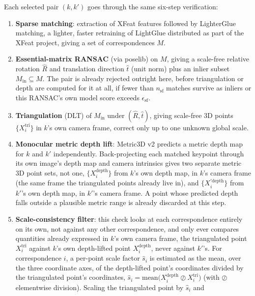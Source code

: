 Each selected pair $(k, k')$ goes through the same six-step verification:
\begin{enumerate}
  \item \textbf{Sparse matching}: extraction of XFeat features \cite{potje2024xfeat} followed by
    LighterGlue matching, a lighter, faster retraining of LightGlue
    \cite{lindenberger2023lightglue} distributed as part of the XFeat project, giving a
 set of correspondences $M$.
  \item \textbf{Essential-matrix RANSAC} (via poselib) on $M$, giving a scale-free relative
    rotation $\hat{R}$ and translation direction $\hat{t}$ (unit norm) plus an inlier subset
    $M_{\mathrm{in}} \subseteq M$. The pair is already rejected outright here, before
    triangulation or depth are computed for it at all, if fewer than $n_{\mathrm{sf}}$ matches
    survive as inliers or this RANSAC's own model score exceeds $\epsilon_{\mathrm{sf}}$.
  \item \textbf{Triangulation} (DLT) of $M_{\mathrm{in}}$ under $(\hat{R}, \hat{t})$, giving
    scale-free 3D points $\{X_i^{\mathrm{tri}}\}$ in $k$'s own camera frame, correct only up to
    one unknown global scale.
  \item \textbf{Monocular metric depth lift}: Metric3D v2 \cite{hu2024metric3dv2} predicts a
    metric depth map for $k$ and $k'$ independently. Back-projecting each matched keypoint
    through its own image's depth map and camera intrinsics gives two separate metric 3D point
    sets, not one, $\{X_i^{\mathrm{depth}}\}$ from $k$'s own depth map, in $k$'s camera frame
    (the same frame the triangulated points already live in), and $\{X_i^{\prime\mathrm{depth}}\}$
    from $k'$'s own depth map, in $k'$'s camera frame. A point whose predicted depth falls
    outside a plausible metric range is already discarded at this step.
  \item \textbf{Scale-consistency filter}: this check looks at each correspondence entirely on
    its own, not against any other correspondence, and only ever compares quantities already
    expressed in $k$'s own camera frame, the triangulated point $X_i^{\mathrm{tri}}$ against
    $k$'s own depth-lifted point $X_i^{\mathrm{depth}}$, never against $k'$'s. For
    correspondence $i$, a per-point scale factor $\hat{s}_i$ is estimated as the mean, over the
    three coordinate axes, of the depth-lifted point's coordinates divided by the triangulated
    point's coordinates,
    $\hat{s}_i = \mathrm{mean}\big(X_i^{\mathrm{depth}} \oslash X_i^{\mathrm{tri}}\big)$ (with
    $\oslash$ elementwise division). Scaling the triangulated point by $\hat{s}_i$ and

\end{enumerate}

